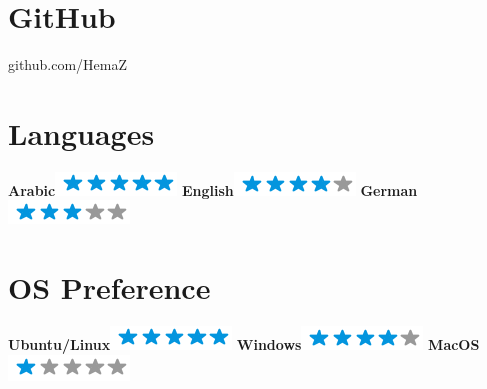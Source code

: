 \documentclass[]{friggeri-cv}
\begin{document}
   \begin{aside}
   \section{GitHub}
github.com/HemaZ   
~
\section{Languages}
    \textbf{Arabic}\includegraphics[scale=0.40]{img/5stars.png}
    \textbf{English}\includegraphics[scale=0.40]{img/4stars.png}
    \textbf{German}\includegraphics[scale=0.40]{img/3stars.png}
    ~
    \section{OS Preference}
    {\small \textbf{Ubuntu/Linux}}\includegraphics[scale=0.40]{img/5stars.png}
    \textbf{Windows}\includegraphics[scale=0.40]{img/4stars.png}
    \textbf{MacOS}\includegraphics[scale=0.40]{img/1stars.png}
    ~

\end{aside}
\end{document}
